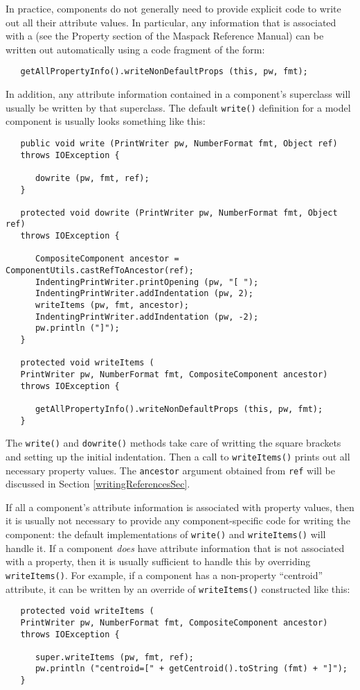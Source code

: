 \documentclass{article}
\begin{document}
In practice, components do not generally need to provide explicit code
to write out all their attribute values. In particular, any
information that is associated with a
 (see the Property section of
the Maspack Reference Manual) can be written out automatically using a
code fragment of the form:
\begin{lstlisting}
   getAllPropertyInfo().writeNonDefaultProps (this, pw, fmt);
\end{lstlisting}
In addition, any attribute information contained in a component's
superclass will usually be written by that superclass.
The default {\tt write()} definition for a model component
is usually looks something like this:
\begin{lstlisting}
   public void write (PrintWriter pw, NumberFormat fmt, Object ref)
   throws IOException {

      dowrite (pw, fmt, ref);
   }

   protected void dowrite (PrintWriter pw, NumberFormat fmt, Object ref)
   throws IOException {

      CompositeComponent ancestor = ComponentUtils.castRefToAncestor(ref);
      IndentingPrintWriter.printOpening (pw, "[ ");
      IndentingPrintWriter.addIndentation (pw, 2);
      writeItems (pw, fmt, ancestor);
      IndentingPrintWriter.addIndentation (pw, -2);
      pw.println ("]");
   }

   protected void writeItems (
   PrintWriter pw, NumberFormat fmt, CompositeComponent ancestor) 
   throws IOException {

      getAllPropertyInfo().writeNonDefaultProps (this, pw, fmt);
   }
\end{lstlisting}
The {\tt write()} and {\tt dowrite()} methods take care of writting
the square brackets and setting up the initial indentation. Then a
call to {\tt writeItems()} prints out all necessary property
values. The {\tt ancestor} argument obtained from {\tt ref} will be
discussed in Section \ref{writingReferencesSec}.

If all a component's attribute information is associated with
property values, then it is usually not necessary to provide
any component-specific code for writing the component: the
default implementations of {\tt write()} and {\tt writeItems()}
will handle it. If a component {\it does} have attribute information
that is not associated with a property, then it is
usually sufficient to handle this by overriding {\tt writeItems()}.
For example,
if a component has a non-property ``centroid'' attribute,
it can be written by an override of {\tt writeItems()} 
constructed like this:
\begin{lstlisting}
   protected void writeItems (
   PrintWriter pw, NumberFormat fmt, CompositeComponent ancestor) 
   throws IOException {

      super.writeItems (pw, fmt, ref);
      pw.println ("centroid=[" + getCentroid().toString (fmt) + "]");      
   }   
\end{lstlisting}
\end{document}

